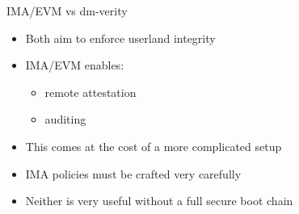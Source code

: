 \begin{frame}{IMA/EVM vs dm-verity}
  \begin{itemize}
    \item Both aim to enforce userland integrity
    \item IMA/EVM enables:
    \begin{itemize}
      \item remote attestation
      \item auditing
    \end{itemize}
    \item This comes at the cost of a more complicated setup
    \item IMA policies must be crafted very carefully
    \item Neither is very useful without a full secure boot chain
  \end{itemize}
\end{frame}

